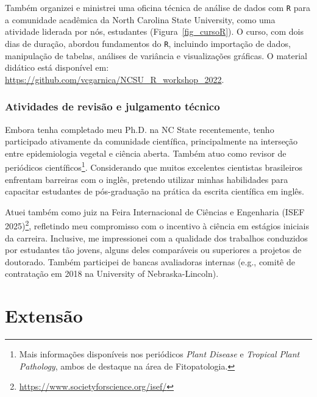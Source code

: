 \documentclass[12pt,a4paper,oneside]{book}
\newcommand{\UNL}{University of Nebraska-Lincoln}
\newcommand{\NCState}{North Carolina State University}
\begin{document}
Também organizei e ministrei uma oficina técnica de análise de dados com \texttt{R} para a comunidade acadêmica da \NCState{},
como uma atividade liderada por nós, estudantes (Figura~\ref{fig_cursoR}). O curso, com dois dias de duração, abordou 
fundamentos do \texttt{R}, incluindo importação de dados, 
manipulação de tabelas, análises de variância e visualizações gráficas. O material didático está disponível 
em: \url{https://github.com/vcgarnica/NCSU_R_workshop_2022}.

\subsection{Atividades de revisão e julgamento técnico}

Embora tenha completado meu Ph.D. na NC State recentemente, tenho participado ativamente da comunidade 
científica, principalmente na interseção entre epidemiologia vegetal e ciência aberta. Também atuo como revisor de periódicos 
científicos\footnote{Mais informações disponíveis nos periódicos \textit{Plant Disease} e \textit{Tropical Plant Pathology}, 
ambos de destaque na área de Fitopatologia.}. Considerando que muitos excelentes cientistas 
brasileiros enfrentam barreiras com o inglês, pretendo utilizar minhas habilidades para 
capacitar estudantes de pós-graduação na prática da escrita científica em inglês.

Atuei também como juiz na Feira Internacional de Ciências e Engenharia (ISEF 2025)\footnote{\url{https://www.societyforscience.org/isef/}}, 
refletindo meu compromisso com o incentivo à ciência em estágios iniciais da carreira. Inclusive, 
me impressionei com a qualidade dos trabalhos conduzidos por estudantes tão jovens, alguns deles 
comparáveis ou superiores a projetos de doutorado. Também participei de bancas avaliadoras 
internas (e.g., comitê de contratação em 2018 na \UNL{}).


  \chapter{Extensão}
\label{cap_extensao}
\end{document}
